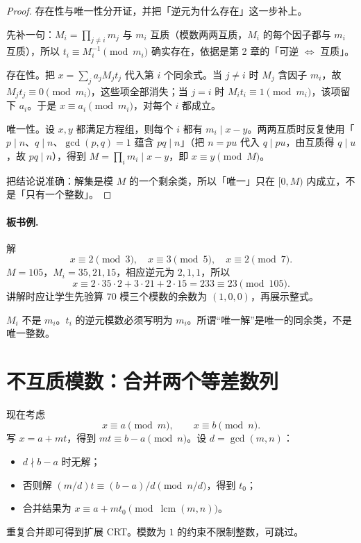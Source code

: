 \documentclass[UTF8,a4paper,11pt,oneside,openany,fontset=fandol]{ctexbook}
\theoremstyle{definition}
\newcommand{\lcm}{\operatorname{lcm}}
\begin{document}
\begin{proof}
存在性与唯一性分开证，并把「逆元为什么存在」这一步补上。

先补一句：$M_i=\prod_{j\ne i}m_j$ 与 $m_i$ 互质（模数两两互质，$M_i$ 的每个因子都与 $m_i$ 互质），所以 $t_i\equiv M_i^{-1}\pmod{m_i}$ 确实存在，依据是第 2 章的「可逆 $\iff$ 互质」。

存在性。把 $x=\sum_j a_jM_jt_j$ 代入第 $i$ 个同余式。当 $j\ne i$ 时 $M_j$ 含因子 $m_i$，故 $M_jt_j\equiv0\pmod{m_i}$，这些项全部消失；当 $j=i$ 时 $M_it_i\equiv1\pmod{m_i}$，该项留下 $a_i$。于是 $x\equiv a_i\pmod{m_i}$，对每个 $i$ 都成立。

唯一性。设 $x,y$ 都满足方程组，则每个 $i$ 都有 $m_i\mid x-y$。两两互质时反复使用「$p\mid n$、$q\mid n$、$\gcd(p,q)=1$ 蕴含 $pq\mid n$」（把 $n=pu$ 代入 $q\mid pu$，由互质得 $q\mid u$，故 $pq\mid n$），得到 $M=\prod_i m_i\mid x-y$，即 $x\equiv y\pmod M$。

把结论说准确：解集是模 $M$ 的一个剩余类，所以「唯一」只在 $[0,M)$ 内成立，不是「只有一个整数」。
\end{proof}

\paragraph{板书例.} 解
\[
 x\equiv2\pmod3,\quad x\equiv3\pmod5,\quad x\equiv2\pmod7.
\]
$M=105$，$M_i=35,21,15$，相应逆元为 $2,1,1$，所以
\[
 x\equiv2\cdot35\cdot2+3\cdot21+2\cdot15=233\equiv23\pmod{105}.
\]
讲解时应让学生先验算 $70$ 模三个模数的余数为 $(1,0,0)$，再展示整式。
\begin{pitfall}
$M_i$ 不是 $m_i$。$t_i$ 的逆元模数必须写明为 $m_i$。所谓“唯一解”是唯一的同余类，不是唯一整数。
\end{pitfall}


\section{不互质模数：合并两个等差数列}
现在考虑
\[
 x\equiv a\pmod m,\qquad x\equiv b\pmod n.
\]
写 $x=a+mt$，得到 $mt\equiv b-a\pmod n$。设 $d=\gcd(m,n)$：
\begin{itemize}
\item $d\nmid b-a$ 时无解；
\item 否则解 $(m/d)t\equiv(b-a)/d\pmod{n/d}$，得到 $t_0$；
\item 合并结果为 $x\equiv a+mt_0\pmod{\lcm(m,n)}$。
\end{itemize}
重复合并即可得到扩展 CRT。模数为 $1$ 的约束不限制整数，可跳过。
\end{document}
